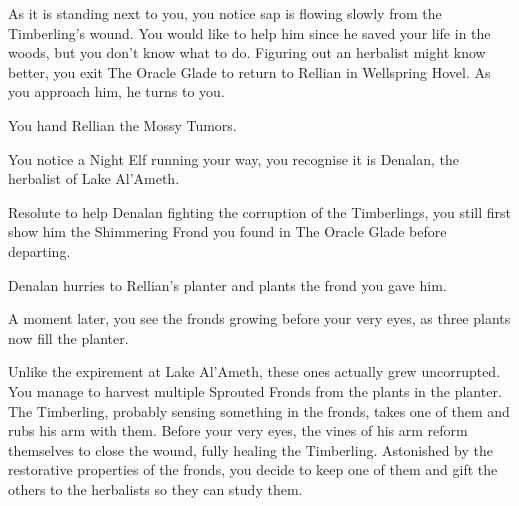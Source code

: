 As it is standing next to you, you notice sap is flowing slowly from the Timberling's wound. You would like to help him since he saved your life in the woods, but you don't know what to do. Figuring out an herbalist might know better, you exit The Oracle Glade to return to Rellian in Wellspring Hovel. As you approach him, he turns to you.


You hand Rellian the Mossy Tumors.


You notice a Night Elf running your way, you recognise it is Denalan, the herbalist of Lake Al'Ameth.


Resolute to help Denalan fighting the corruption of the Timberlings, you still first show him the Shimmering Frond you found in The Oracle Glade before departing.


Denalan hurries to Rellian's planter and plants the frond you gave him.


A moment later, you see the fronds growing before your very eyes, as three plants now fill the planter.


Unlike the expirement at Lake Al'Ameth, these ones actually grew uncorrupted. You manage to harvest multiple Sprouted Fronds from the plants in the planter. The Timberling, probably sensing something in the fronds, takes one of them and rubs his arm with them. Before your very eyes, the vines of his arm reform themselves to close the wound, fully healing the Timberling. Astonished by the restorative properties of the fronds, you decide to keep one of them and gift the others to the herbalists so they can study them.

